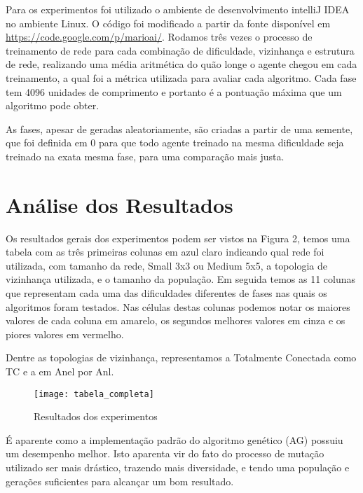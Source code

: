 \documentclass[a4paper,12pt]{article}
\begin{document}
      Para os experimentos foi utilizado o ambiente de desenvolvimento intelliJ IDEA no ambiente 
      Linux. O código foi modificado a partir da fonte disponível em 
      \url{https://code.google.com/p/marioai/}. Rodamos três vezes o processo de treinamento de 
      rede para cada combinação de dificuldade, vizinhança e estrutura de rede, realizando 
      uma média aritmética do quão longe o agente chegou em cada treinamento, a qual foi a 
      métrica utilizada para avaliar cada algoritmo. Cada fase tem 4096 unidades de comprimento 
      e portanto é a pontuação máxima que um algoritmo pode obter.

      As fases, apesar de geradas aleatoriamente, são criadas a partir de uma semente, que foi 
      definida em 0 para que todo agente treinado na mesma dificuldade seja treinado na exata 
      mesma fase, para uma comparação mais justa.
  
  \section{Análise dos Resultados}
  
    Os resultados gerais dos experimentos podem ser vistos na Figura 2, temos uma tabela com as três 
    primeiras colunas em azul claro indicando qual rede foi utilizada, com tamanho da rede, Small 3x3 ou 
    Medium 5x5, a topologia de vizinhança utilizada, e o tamanho da população. Em seguida 
    temos as 11 colunas que representam cada uma das dificuldades diferentes de fases nas quais 
    os algoritmos foram testados. Nas células destas colunas podemos notar os maiores valores 
    de cada coluna em amarelo, os segundos melhores valores em cinza e os piores valores em vermelho.
    
    Dentre as topologias de vizinhança, representamos a Totalmente Conectada como TC e a em Anel por Anl.
    
    \begin{figure}[!htb]
	\centering
	\texttt{[image: tabela\_completa]}
	\caption{Resultados dos experimentos}
	\label{Figura 2}
      \end{figure}
    
    É aparente como a implementação padrão do algoritmo genético (AG) possuiu um desempenho melhor. 
    Isto aparenta vir do fato do processo de mutação utilizado ser mais drástico, trazendo mais 
    diversidade, e tendo uma população e gerações suficientes para alcançar um bom resultado.
    
\end{document}
